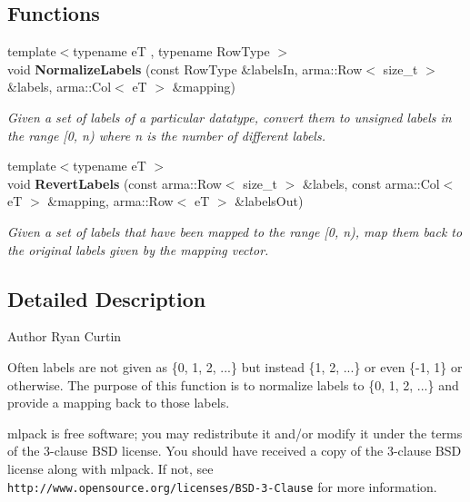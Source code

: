 \subsection*{Functions}
\begin{DoxyCompactItemize}
\item 
{\footnotesize template$<$typename eT , typename Row\+Type $>$ }\\void \textbf{ Normalize\+Labels} (const Row\+Type \&labels\+In, arma\+::\+Row$<$ size\+\_\+t $>$ \&labels, arma\+::\+Col$<$ eT $>$ \&mapping)
\begin{DoxyCompactList}\small\item\em Given a set of labels of a particular datatype, convert them to unsigned labels in the range [0, n) where n is the number of different labels. \end{DoxyCompactList}\item 
{\footnotesize template$<$typename eT $>$ }\\void \textbf{ Revert\+Labels} (const arma\+::\+Row$<$ size\+\_\+t $>$ \&labels, const arma\+::\+Col$<$ eT $>$ \&mapping, arma\+::\+Row$<$ eT $>$ \&labels\+Out)
\begin{DoxyCompactList}\small\item\em Given a set of labels that have been mapped to the range [0, n), map them back to the original labels given by the \textquotesingle{}mapping\textquotesingle{} vector. \end{DoxyCompactList}\end{DoxyCompactItemize}


\subsection{Detailed Description}
\begin{DoxyAuthor}{Author}
Ryan Curtin
\end{DoxyAuthor}
Often labels are not given as \{0, 1, 2, ...\} but instead \{1, 2, ...\} or even \{-\/1, 1\} or otherwise. The purpose of this function is to normalize labels to \{0, 1, 2, ...\} and provide a mapping back to those labels.

mlpack is free software; you may redistribute it and/or modify it under the terms of the 3-\/clause B\+SD license. You should have received a copy of the 3-\/clause B\+SD license along with mlpack. If not, see {\tt http\+://www.\+opensource.\+org/licenses/\+B\+S\+D-\/3-\/\+Clause} for more information. 